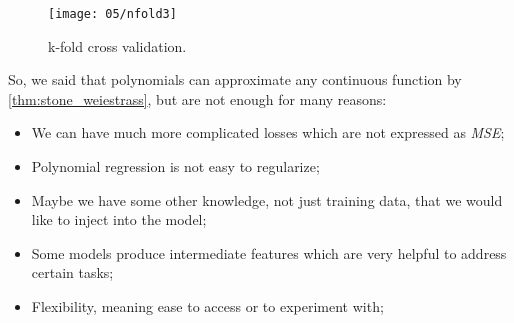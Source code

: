 \begin{figure}[H]
	\centering
	\texttt{[image: 05/nfold3]}
	\caption{k-fold cross validation.}\label{fig_cross_valid}	
\end{figure}

So, we said that polynomials can approximate any continuous function by \cref{thm:stone_weiestrass}, but are not enough for many reasons:
\begin{itemize}
 	\item We can have much more complicated losses which are not expressed as \emph{MSE};
 	\item Polynomial regression is not easy to regularize;
 	\item Maybe we have some other knowledge, not just training data, that we would like to inject into the model;
 	\item Some models produce intermediate features which are very helpful to address certain tasks;
 	\item Flexibility, meaning ease to access or to experiment with;
 \end{itemize} 
